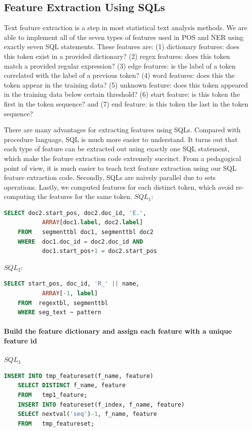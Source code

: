 \documentclass[11pt,letterpaper]{article}
\begin{document}
\subsection{Feature Extraction Using SQLs}
Text feature extraction is a step in most statistical text analysis methods.
We are able to implement all of the seven types of features used in POS and NER using exactly seven 
SQL statements. These features are: 
(1) dictionary features: does this token exist in a provided dictionary? 
(2) regex features: does this token match a provided regular expression? 
(3) edge features: is the label of a token correlated with the label of a previous token? 
(4) word features: does this the token appear in the training data?
(5) unknown feature: does this token appeared in the training data below certain threshold? 
(6) start feature: is this token the ﬁrst in the token sequence? and 
(7) end feature: is this token the last in the token sequence?

There are many advantages for extracting features using SQLs.  
Compared with procedure language, SQL is much more easier to understand. 
It turns out that each type of feature can be extracted out using exactly one SQL statement, 
which make the feature extraction code extremely succinct.  
From a pedagogical point of view, it is much easier to teach text feature extraction using our SQL feature extraction code.
Secondly, SQLs are naïvely parallel due to sets operations. 
Lastly, we computed features for each distinct token, which avoid re-computing the features for the same token.  
$SQL_1$:\\
\begin{lstlisting}[language=SQL,gobble=4]
    SELECT doc2.start_pos, doc2.doc_id, 'E.', 
           ARRAY[doc1.label, doc2.label]
    FROM   segmenttbl doc1, segmenttbl doc2
    WHERE  doc1.doc_id = doc2.doc_id AND 
           doc1.start_pos+1 = doc2.start_pos
\end{lstlisting}

$SQL_2$:\\
\begin{lstlisting}[language=SQL,gobble=4]
    SELECT start_pos, doc_id, 'R_' || name, 
           ARRAY[-1, label]
    FROM  regextbl, segmenttbl
    WHERE seg_text ~ pattern
\end{lstlisting}

\paragraph{Build the feature dictionary and assign each feature with a unique feature id}
$SQL_3$\\ 
\begin{lstlisting}[language=SQL,gobble=4]
    INSERT INTO tmp_featureset(f_name, feature) 
    SELECT DISTINCT f_name, feature
    FROM   tmp1_feature;
    INSERT INTO featureset(f_index, f_name, feature) 
    SELECT nextval('seq')-1, f_name, feature
    FROM   tmp_featureset;
\end{lstlisting}
\end{document}
